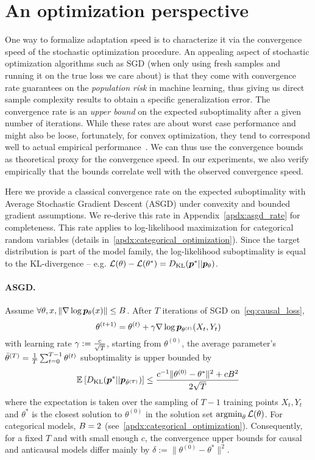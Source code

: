 \section{An optimization perspective}
\label{sec:opt_alg}
One way to formalize adaptation speed is to characterize it via the convergence speed of the stochastic optimization procedure. An appealing aspect of stochastic optimization algorithms such as SGD (when only using fresh samples and running it on the true loss we care about) is that they come with convergence rate guarantees on the \emph{population risk} in machine learning, thus giving us direct sample complexity results to obtain a specific generalization error.
The convergence rate is an \emph{upper bound} on the expected suboptimality after a given number of iterations.
While these rates are about worst case performance and might also be loose, fortunately, for convex optimization, they tend to correspond well to actual empirical performance~\citep{nesterov2004Intro}.
We can thus use the convergence bounds as theoretical proxy for the convergence speed.
In our experiments, we also verify empirically that the bounds correlate well with the observed convergence speed.

Here we provide a classical convergence rate on the expected suboptimality with Average Stochastic Gradient Descent (ASGD) under convexity and bounded gradient assumptions. 
We re-derive this rate in Appendix~\ref{apdx:asgd_rate} for completeness.
This rate applies to log-likelihood maximization for categorical random variables (details in~\ref{apdx:categorical_optimization}). 
Since the target distribution is part of the model family, the log-likelihood suboptimality is equal to the KL-divergence  -- e.g. ${\mathcal L}(\theta) - {\mathcal L}(\theta^*) = D_{\mathrm{KL}}(\bm{p}^* || \bm{p}_\theta)$.

\paragraph{ASGD.} 
Assume $\forall \theta, x, \|\nabla \log \bm{p}_\theta(x) \| \leq B$.
After $T$ iterations of SGD on~\eqref{eq:causal_loss},
\begin{equation}
    \theta^{(t+1)} = \theta^{(t)} + \gamma \nabla \log \bm{p}_{\theta^{(t)}}(X_t,Y_t)
\end{equation}
with learning rate $\gamma := \frac{c}{\sqrt{T}}$,
starting from $\theta^{(0)}$,
the average parameter's $\bar \theta^{(T)} = \frac{1}{T} \sum_{t=0}^{T-1} \theta^{(t)}$ suboptimality  is upper bounded by
\begin{align}
    \mathbb{E}_{} \left[ D_{\mathrm{KL}}(\bm{p}^*||\bm{p}_{\bar \theta^{(T)}}) \right] 
    \leq \frac{
    c^{-1} \|\theta^{(0)} - \theta^* \|^2
     + c B^2}{2 \sqrt{T}}
    \label{eq:sgd_rate}
\end{align}
where the expectation is taken over the sampling of $T-1$ training points $X_t,Y_t$ and $\theta^*$ is the closest solution to $\theta^{(0)}$ in the solution set
$\operatorname*{argmin}_\theta {\mathcal L}(\theta)$. 
For categorical models, $B=2$ (see~\ref{apdx:categorical_optimization}).
Consequently, for a fixed $T$ and with small enough $c$, the convergence upper bounds for causal and anticausal models  differ mainly by $\delta := \|\theta^{(0)} - \theta^* \|^2$.


